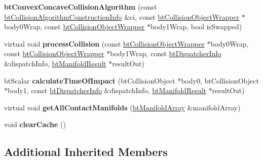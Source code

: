 \begin{DoxyCompactItemize}
\item 
\mbox{\label{classbtConvexConcaveCollisionAlgorithm_a163b3a3ea828565ea58e6acfd7434505}} 
{\bfseries bt\+Convex\+Concave\+Collision\+Algorithm} (const \hyperlink{structbtCollisionAlgorithmConstructionInfo}{bt\+Collision\+Algorithm\+Construction\+Info} \&ci, const \hyperlink{structbtCollisionObjectWrapper}{bt\+Collision\+Object\+Wrapper} $\ast$body0\+Wrap, const \hyperlink{structbtCollisionObjectWrapper}{bt\+Collision\+Object\+Wrapper} $\ast$body1\+Wrap, bool is\+Swapped)
\item 
\mbox{\label{classbtConvexConcaveCollisionAlgorithm_abd99ff6be221a0e9df9360dd6c89d976}} 
virtual void {\bfseries process\+Collision} (const \hyperlink{structbtCollisionObjectWrapper}{bt\+Collision\+Object\+Wrapper} $\ast$body0\+Wrap, const \hyperlink{structbtCollisionObjectWrapper}{bt\+Collision\+Object\+Wrapper} $\ast$body1\+Wrap, const \hyperlink{structbtDispatcherInfo}{bt\+Dispatcher\+Info} \&dispatch\+Info, \hyperlink{classbtManifoldResult}{bt\+Manifold\+Result} $\ast$result\+Out)
\item 
\mbox{\label{classbtConvexConcaveCollisionAlgorithm_a6d6690180cedd5e41c5ce632a2fb2350}} 
bt\+Scalar {\bfseries calculate\+Time\+Of\+Impact} (bt\+Collision\+Object $\ast$body0, bt\+Collision\+Object $\ast$body1, const \hyperlink{structbtDispatcherInfo}{bt\+Dispatcher\+Info} \&dispatch\+Info, \hyperlink{classbtManifoldResult}{bt\+Manifold\+Result} $\ast$result\+Out)
\item 
\mbox{\label{classbtConvexConcaveCollisionAlgorithm_a7778a7ba3b7a990ce722ed43a71d0025}} 
virtual void {\bfseries get\+All\+Contact\+Manifolds} (\hyperlink{classbtAlignedObjectArray}{bt\+Manifold\+Array} \&manifold\+Array)
\item 
\mbox{\label{classbtConvexConcaveCollisionAlgorithm_a73fa1c9ce188094312b3372e1948dcf5}} 
void {\bfseries clear\+Cache} ()
\end{DoxyCompactItemize}
\subsection*{Additional Inherited Members}


